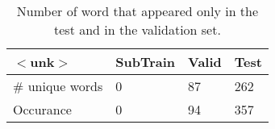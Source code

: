 \begin{table}[H]
\begin{center}
\begin{tabular}{|l|l|l|l|}
\hline $<$unk$>$ & SubTrain& Valid& Test\\ \hline
# unique words & 0 & 87 & 262 \\ \hline
Occurance & 0 & 94 & 357 \\ \hline
\end{tabular}
\end{center}
\caption{\label{UnkSubtrainValidTestCorpus} Number of word that appeared only in the test and in the validation set.}
\end{table}
